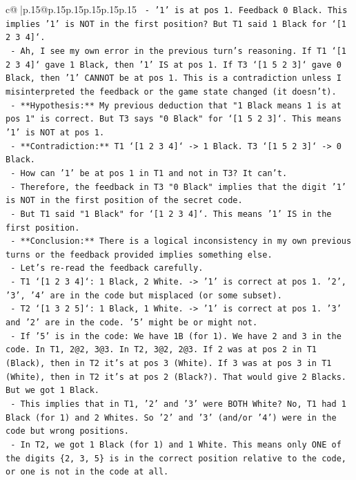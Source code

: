 \documentclass{article}
\begin{document}
{\begin{supertabular}{c@{$\;$}|p{.15\linewidth}@{}p{.15\linewidth}p{.15\linewidth}p{.15\linewidth}p{.15\linewidth}p{.15\linewidth}}
{{{\texttt{    {-} '1' is at pos 1. Feedback 0 Black. This implies '1' is NOT in the first position? But T1 said 1 Black for `{[}1 2 3 4{]}`.} \\
\texttt{    {-} Ah, I see my own error in the previous turn's reasoning. If T1 `{[}1 2 3 4{]}` gave 1 Black, then '1' IS at pos 1. If T3 `{[}1 5 2 3{]}` gave 0 Black, then '1' CANNOT be at pos 1. This is a contradiction unless I misinterpreted the feedback or the game state changed (it doesn't).} \\
\texttt{    {-} **Hypothesis:** My previous deduction that "1 Black means 1 is at pos 1" is correct. But T3 says "0 Black" for `{[}1 5 2 3{]}`. This means '1' is NOT at pos 1.} \\
\texttt{    {-} **Contradiction:** T1 `{[}1 2 3 4{]}` {-}> 1 Black. T3 `{[}1 5 2 3{]}` {-}> 0 Black.} \\
\texttt{    {-} How can '1' be at pos 1 in T1 and not in T3? It can't.} \\
\texttt{    {-} Therefore, the feedback in T3 "0 Black" implies that the digit '1' is NOT in the first position of the secret code.} \\
\texttt{    {-} But T1 said "1 Black" for `{[}1 2 3 4{]}`. This means '1' IS in the first position.} \\
\texttt{    {-} **Conclusion:** There is a logical inconsistency in my own previous turns or the feedback provided implies something else.} \\
\texttt{    {-} Let's re{-}read the feedback carefully.} \\
\texttt{      {-} T1 `{[}1 2 3 4{]}`: 1 Black, 2 White. {-}> '1' is correct at pos 1. '2', '3', '4' are in the code but misplaced (or some subset).} \\
\texttt{      {-} T2 `{[}1 3 2 5{]}`: 1 Black, 1 White. {-}> '1' is correct at pos 1. '3' and '2' are in the code. '5' might be or might not.} \\
\texttt{        {-} If '5' is in the code: We have 1B (for 1). We have 2 and 3 in the code. In T1, 2@2, 3@3. In T2, 3@2, 2@3. If 2 was at pos 2 in T1 (Black), then in T2 it's at pos 3 (White). If 3 was at pos 3 in T1 (White), then in T2 it's at pos 2 (Black?). That would give 2 Blacks. But we got 1 Black.} \\
\texttt{        {-} This implies that in T1, '2' and '3' were BOTH White? No, T1 had 1 Black (for 1) and 2 Whites. So '2' and '3' (and/or '4') were in the code but wrong positions.} \\
\texttt{        {-} In T2, we got 1 Black (for 1) and 1 White. This means only ONE of the digits \{2, 3, 5\} is in the correct position relative to the code, or one is not in the code at all.} \\
}}}
\end{supertabular}}
\end{document}
